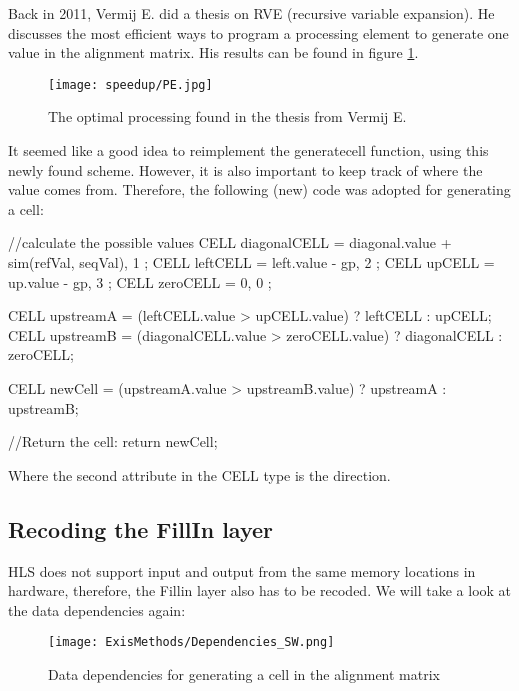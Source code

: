Back in 2011, Vermij E. did a thesis\cite{Vermij} on RVE (recursive variable expansion). He discusses the most efficient ways to program a processing element to generate one value in the alignment matrix. His results can be found in figure \ref{fig:PE}. 

\begin{figure}[H]
	\centering
	\texttt{[image: speedup/PE.jpg]}
	\caption{The optimal processing found in the thesis from Vermij E.\cite{Vermij}}
	\label{fig:PE}
\end{figure}

It seemed like a good idea to reimplement the generatecell function, using this newly found scheme. However, it is also important to keep track of where the value comes from. Therefore, the following (new) code was adopted for generating a cell:

\begin{lcverbatim}
//calculate the possible  values
CELL diagonalCELL = { diagonal.value + sim(refVal, seqVal), 1 };
CELL leftCELL = { left.value - gp, 2 };
CELL upCELL = { up.value - gp, 3 };
CELL zeroCELL = { 0, 0 };

CELL upstreamA = (leftCELL.value > upCELL.value) ? leftCELL : upCELL;
CELL upstreamB = (diagonalCELL.value > zeroCELL.value) ? 
diagonalCELL : zeroCELL;

CELL newCell = (upstreamA.value > upstreamB.value) ? upstreamA : upstreamB;

//Return the cell:
return newCell;
\end{lcverbatim}
Where the second attribute in the CELL type is the direction.

\subsection{Recoding the FillIn layer}

HLS does not support input and output from the same memory locations in hardware, therefore, the Fillin layer also has to be recoded. We will take a look at the data dependencies again:

\begin{figure}[H]
	\centering
	\texttt{[image: ExisMethods/Dependencies\_SW.png]}
	\caption{Data dependencies for generating a cell in the alignment matrix}
	\label{fig:DatDep2}
\end{figure}

